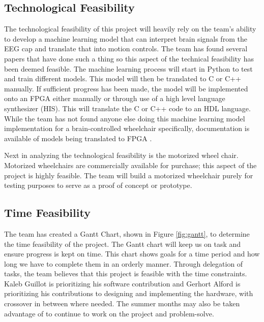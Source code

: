\documentclass[conference]{IEEEtran}
\begin{document}
        \subsection{Technological Feasibility}
        The technological feasibility of this project will heavily rely on the team's ability to develop a machine learning model that can interpret brain signals from the EEG cap and translate that into motion controls. The team has found several papers that have done such a thing \cite{robotic_architecture, learning_to_control, toward_brain_computer, self_paced, fpga_intel} so this aspect of the technical feasibility has been deemed feasible. The machine learning process will start in Python to test and train different models. This model will then be translated to C or C++ manually. If sufficient progress has been made, the model will be implemented onto an FPGA either manually or through use of a high level language synthesizer (HIS). This will translate the C or C++ code to an HDL language. While the team has not found anyone else doing this machine learning model implementation for a brain-controlled wheelchair specifically, documentation is available of models being translated to FPGA \cite{fpga_intel}.  

        Next in analyzing the technological feasibility is the motorized wheel chair. Motorized wheelchairs are commercially available for purchase; this aspect of the project is highly feasible. The team will build a motorized wheelchair purely for testing purposes to serve as a proof of concept or prototype.

        \subsection{Time Feasibility}
        The team has created a Gantt Chart, shown in Figure \ref{fig:gantt}, to determine the time feasibility of the project. The Gantt chart will keep us on task and ensure progress is kept on time. This chart shows goals for a time period and how long we have to complete them in an orderly manner. Through delegation of tasks, the team believes that this project is feasible with the time constraints. Kaleb Guillot is prioritizing his software contribution and Gerhort Alford is prioritizing his contributions to designing and implementing the hardware, with crossover in between where needed. The summer months may also be taken advantage of to continue to work on the project and problem-solve. 
\end{document}

